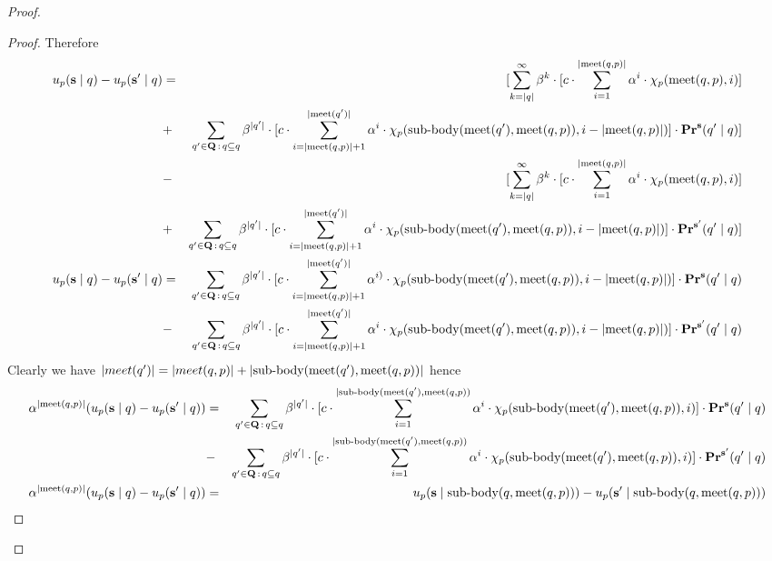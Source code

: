\begin{proof}
\begin{proof}
Therefore
\begin{eqnarray*}
	u_p(\mathbf{s} \mid q) - u_p(\mathbf{s}' \mid q) & = & [\sum_{k = |q|}^{\infty} \beta^{k} \cdot  [{\displaystyle c \cdot \sum_{i=1}^{|\text{\rm meet}(q,p)|} \alpha^i \cdot \chi_p(\text{\rm meet}(q,p),i) }] \\
	&+ & \sum_{q' \in \mathbf{Q} \,:\, q \subseteq q} \beta^{|q'|} \cdot  [{\displaystyle c \cdot \sum_{i=|\text{\rm meet}(q,p)|+1}^{|\text{\rm meet}(q')|} \alpha^{i} \cdot \chi_p({\text{\rm sub-body}}(\text{\rm meet}(q'),\text{\rm meet}(q,p)),i-|\text{\rm meet}(q,p)|)  }] \cdot \mathbf{Pr}^{\mathbf{s}}(q' \mid q) ]\\ 
	&- &[\sum_{k = |q|}^{\infty} \beta^{k} \cdot  [{\displaystyle c \cdot \sum_{i=1}^{|\text{\rm meet}(q,p)|} \alpha^i \cdot \chi_p(\text{\rm meet}(q,p),i) }] \\
	&+ & \sum_{q' \in \mathbf{Q} \,:\, q \subseteq q} \beta^{|q'|} \cdot  [{\displaystyle c \cdot \sum_{i=|\text{\rm meet}(q,p)|+1}^{|\text{\rm meet}(q')|} \alpha^{i} \cdot \chi_p({\text{\rm sub-body}}(\text{\rm meet}(q'),\text{\rm meet}(q,p)),i-|\text{\rm meet}(q,p)|)  }] \cdot \mathbf{Pr}^{\mathbf{s}'}(q' \mid q) ]\\ 
	u_p(\mathbf{s} \mid q) - u_p(\mathbf{s}' \mid q) & = & \sum_{q' \in \mathbf{Q} \,:\, q \subseteq q} \beta^{|q'|} \cdot  [{\displaystyle c \cdot \sum_{i=|\text{\rm meet}(q,p)|+1}^{|\text{\rm meet}(q')|} \alpha^{i)} \cdot \chi_p({\text{\rm sub-body}}(\text{\rm meet}(q'),\text{\rm meet}(q,p)),i-|\text{\rm meet}(q,p)|)  }] \cdot \mathbf{Pr}^{\mathbf{s}}(q' \mid q) \\ 
	& - & \sum_{q' \in \mathbf{Q} \,:\, q \subseteq q} \beta^{|q'|} \cdot  [{\displaystyle c \cdot \sum_{i=|\text{\rm meet}(q,p)|+1}^{|\text{\rm meet}(q')|} \alpha^{i} \cdot \chi_p({\text{\rm sub-body}}(\text{\rm meet}(q'),\text{\rm meet}(q,p)),i-|\text{\rm meet}(q,p)|)  }] \cdot \mathbf{Pr}^{\mathbf{s}'}(q' \mid q) \\
\end{eqnarray*}
Clearly we have $|meet(q')| = |meet(q,p)| + |{\text{\rm sub-body}}(\text{\rm meet}(q'),\text{\rm meet}(q,p))| $ hence 
\begin{eqnarray*}
	 \alpha^{|\text{\rm meet}(q,p)|} (u_p(\mathbf{s} \mid q) - u_p(\mathbf{s}' \mid q)) & = & \sum_{q' \in \mathbf{Q} \,:\, q \subseteq q} \beta^{|q'|} \cdot  [{\displaystyle c \cdot \sum_{i=1}^{|{\text{\rm sub-body}}(\text{\rm meet}(q'),\text{\rm meet}(q,p))} \alpha^{i} \cdot \chi_p({\text{\rm sub-body}}(\text{\rm meet}(q'),\text{\rm meet}(q,p)),i)  }] \cdot \mathbf{Pr}^{\mathbf{s}}(q' \mid q) \\ 
	& - & \sum_{q' \in \mathbf{Q} \,:\, q \subseteq q} \beta^{|q'|} \cdot  [{\displaystyle c \cdot \sum_{i=1}^{|{\text{\rm sub-body}}(\text{\rm meet}(q'),\text{\rm meet}(q,p))} \alpha^{i} \cdot \chi_p({\text{\rm sub-body}}(\text{\rm meet}(q'),\text{\rm meet}(q,p)),i)  }] \cdot \mathbf{Pr}^{\mathbf{s}'}(q' \mid q) \\
	\alpha^{|\text{\rm meet}(q,p)|} (u_p(\mathbf{s} \mid q) - u_p(\mathbf{s}' \mid q)) & = & u_p(\mathbf{s} \mid {\text{\rm sub-body}}(q,\text{\rm meet}(q,p))) - u_p(\mathbf{s}' \mid {\text{\rm sub-body}}(q,\text{\rm meet}(q,p))) \\
\end{eqnarray*}
\end{proof}




\end{proof}
